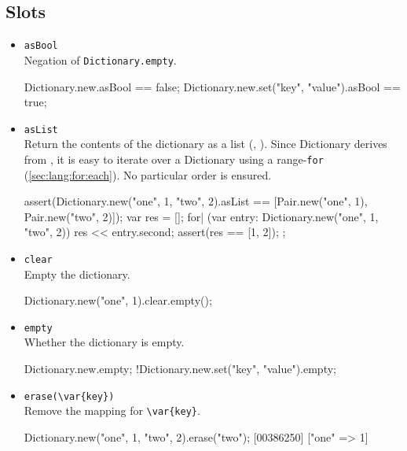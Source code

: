 \subsection{Slots}

\begin{itemize}
\item \lstinline|asBool|\\
  Negation of \lstinline|Dictionary.empty|.
\begin{urbiassert}
Dictionary.new.asBool == false;
Dictionary.new.set("key", "value").asBool == true;
\end{urbiassert}

\item \lstinline|asList|\\
  Return the contents of the dictionary as a  list
  (, ).  Since Dictionary derives from
  , it is easy to iterate over a Dictionary
  using a range-\lstinline|for| (\autoref{sec:lang:for:each}).  No
  particular order is ensured.

\begin{urbiscript}
assert(Dictionary.new("one", 1, "two", 2).asList
       == [Pair.new("one", 1), Pair.new("two", 2)]);
{
  var res = [];
  for| (var entry: Dictionary.new("one", 1, "two", 2))
    res << entry.second;
  assert(res == [1, 2]);
};
\end{urbiscript}

\item \lstinline|clear|\\
  Empty the dictionary.

\begin{urbiassert}
Dictionary.new("one", 1).clear.empty();
\end{urbiassert}

\item \lstinline|empty|\\
  Whether the dictionary is empty.

\begin{urbiassert}
Dictionary.new.empty;
!Dictionary.new.set("key", "value").empty;
\end{urbiassert}

\item \lstinline|erase(\var{key})|\\
  Remove the mapping for \lstinline|\var{key}|.

\begin{urbiscript}
Dictionary.new("one", 1, "two", 2).erase("two");
[00386250] ["one" => 1]
\end{urbiscript}


\end{itemize}
